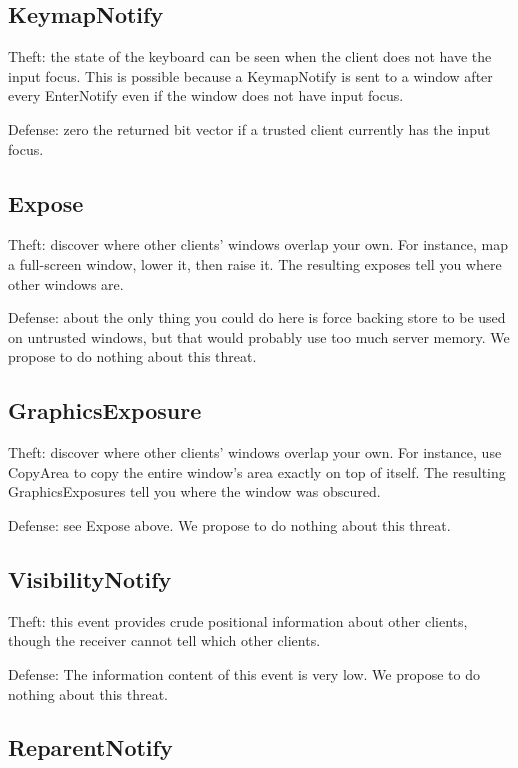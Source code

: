 \subsection{KeymapNotify}

Theft: the state of the keyboard can be seen when the client does not
have the input focus.  This is possible because a KeymapNotify is
sent to a window after every EnterNotify even if the window does not
have input focus.

Defense: zero the returned bit vector if a trusted client currently
has the input focus.



\subsection{Expose}

Theft: discover where other clients' windows overlap your own.  For
instance, map a full-screen window, lower it, then raise it.  The
resulting exposes tell you where other windows are.

Defense: about the only thing you could do here is force backing store
to be used on untrusted windows, but that would probably use too much
server memory.  We propose to do nothing about this threat.



\subsection{GraphicsExposure}

Theft: discover where other clients' windows overlap your own.
For instance, use CopyArea to copy the entire window's area exactly
on top of itself.  The resulting GraphicsExposures tell you where
the window was obscured.

Defense: see Expose above.  We propose to do nothing about this
threat.


\subsection{VisibilityNotify}

Theft: this event provides crude positional information about other
clients, though the receiver cannot tell which other clients.

Defense: The information content of this event is very low.  We
propose to do nothing about this threat.



\subsection{ReparentNotify}

